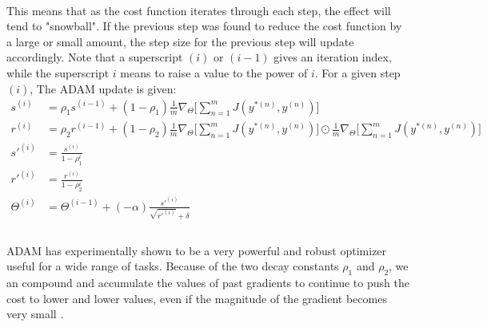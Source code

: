\documentclass[12pt,letterpaper]{article}
\begin{document}
\paragraph*{}This means that as the cost function iterates through each step, the effect will tend to "snowball". If the previous step was found to reduce the cost function by a large or small amount, the step size for the previous step will update accordingly. 
Note that a superscript $(i)$ or $(i-1)$ gives an iteration index, while the superscript $i$ means to raise a value to the power of $i$. For a given step $(i)$, The ADAM update is given:
\begin{equation}
\label{eqn-ADAMupdate}
\begin{split}
s^{(i)} &= \rho_1 s^{(i-1)} + (1 - \rho_1) \frac{1}{m} \nabla_{\Theta} \Big[\sum_{n=1}^{m} J(y^{*(n)},y^{(n)}) \Big]  \\
r^{(i)} &= \rho_2 r^{(i-1)} + (1 - \rho_2) \frac{1}{m} \nabla_{\Theta} \Big[\sum_{n=1}^{m} J(y^{*(n)},y^{(n)}) \Big] \odot
							\frac{1}{m} \nabla_{\Theta} \Big[\sum_{n=1}^{m} J(y^{*(n)},y^{(n)}) \Big]  \\
s'^{(i)} &= \frac{s^{(i)}}{1-\rho_1^i} \\
r'^{(i)} &= \frac{r^{(i)}}{1-\rho_2^i} \\
\Theta^{(i)} &= \Theta^{(i-1)} + (-\alpha)\frac{s'^{(i)}}{\sqrt{r'^{(i)}}+\delta} \\
\end{split}
\end{equation}

\paragraph*{}ADAM has experimentally shown to be a very powerful and robust optimizer useful for a wide range of tasks. Because of the two decay constants $\rho_1$ and $\rho_2$, we an compound and accumulate the values of past gradients to continue to push the cost to lower and lower values, even if the magnitude of the gradient becomes very small \cite{Geron}. 
\end{document}
